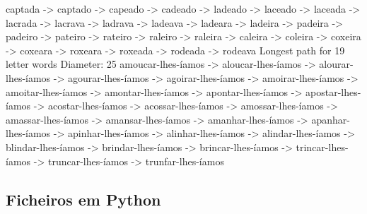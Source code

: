 \documentclass[a4paper,11pt]{article}
\begin{document}
captada -> captado -> capeado -> cadeado -> ladeado -> laceado -> laceada -> lacrada -> lacrava -> ladrava -> ladeava -> ladeara -> ladeira -> padeira -> padeiro -> pateiro -> rateiro -> raleiro -> raleira -> caleira -> coleira -> coxeira -> coxeara -> roxeara -> roxeada -> rodeada -> rodeava
Longest path for 19 letter words
Diameter: 25
amoucar-lhes-íamos -> aloucar-lhes-íamos -> alourar-lhes-íamos -> agourar-lhes-íamos -> agoirar-lhes-íamos -> amoirar-lhes-íamos -> amoitar-lhes-íamos -> amontar-lhes-íamos -> apontar-lhes-íamos -> apostar-lhes-íamos -> acostar-lhes-íamos -> acossar-lhes-íamos -> amossar-lhes-íamos -> amassar-lhes-íamos -> amansar-lhes-íamos -> amanhar-lhes-íamos -> apanhar-lhes-íamos -> apinhar-lhes-íamos -> alinhar-lhes-íamos -> alindar-lhes-íamos -> blindar-lhes-íamos -> brindar-lhes-íamos -> brincar-lhes-íamos -> trincar-lhes-íamos -> truncar-lhes-íamos -> trunfar-lhes-íamos

	\subsection{Ficheiros em Python}
	
	
	
\end{document}
